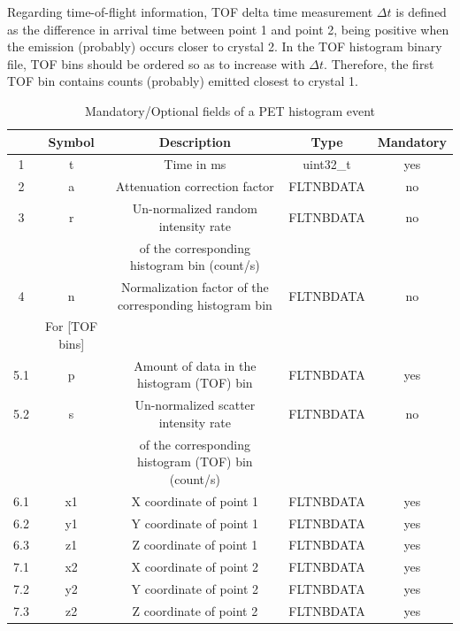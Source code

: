 \documentclass[a4paper, 11pt]{article}
\begin{document}
Regarding time-of-flight information, TOF delta time measurement $\Delta t$ is defined as the difference in arrival time between point 1 and point 2, being positive when the emission (probably) occurs closer to crystal 2. In the TOF histogram binary file, TOF bins should be ordered so as to increase with $\Delta t$. Therefore, the first TOF bin contains counts (probably) emitted closest to crystal 1.

\begin{table} [h!]
  \small
  \caption{Mandatory/Optional fields of a PET histogram event}
  \label{table_PET_data_bin_histogram_cart}
  \begin{center}
  \begin{tabular}{|c|c|c|c|c|}
  \hline
    & \textbf{Symbol} & \textbf{Description} & \textbf{Type} & \textbf{Mandatory}\\
  \hline
  \hline
  1 & t & Time in ms & uint32\_t & yes \\ \hline
  2 & a & Attenuation correction factor & FLTNBDATA & no \\ \hline
  3 & r & Un-normalized random intensity rate & FLTNBDATA & no \\ 
    &  & of the corresponding histogram bin (count/s) & &  \\ \hline
  4 & n & Normalization factor of the corresponding histogram bin & FLTNBDATA & no \\  \hline
  \cellcolor{blue!25}&\cellcolor{blue!25} For [TOF bins] &\cellcolor{blue!25} & \cellcolor{blue!25}& \cellcolor{blue!25} \\ \hline
  5.1 & p & Amount of data in the histogram (TOF) bin & FLTNBDATA & yes \\ \hline
  5.2 & s & Un-normalized scatter intensity rate & FLTNBDATA & no \\
      & & of the corresponding histogram (TOF) bin (count/s) & & \\ \hline
  6.1 & x1 & X coordinate of point 1 & FLTNBDATA & yes \\ \hline
  6.2 & y1 & Y coordinate of point 1 & FLTNBDATA & yes \\ \hline
  6.3 & z1 & Z coordinate of point 1 & FLTNBDATA & yes \\ \hline
  7.1 & x2 & X coordinate of point 2 & FLTNBDATA & yes \\ \hline
  7.2 & y2 & Y coordinate of point 2 & FLTNBDATA & yes \\ \hline
  7.3 & z2 & Z coordinate of point 2 & FLTNBDATA & yes \\ \hline
  \end{tabular}
  \end{center}
\end{table}
\end{document}
